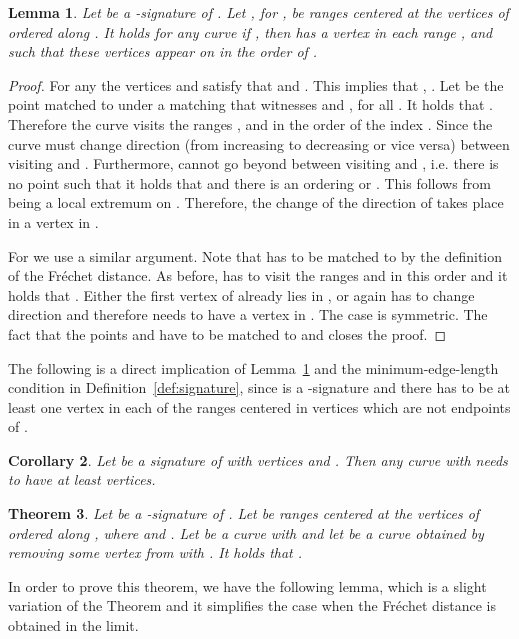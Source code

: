 \documentclass[11pt, letter]{article}
\newtheorem{theorem}{Theorem}[section]
\newtheorem{lemma}[theorem]{Lemma}
\newtheorem{corollary}[theorem]{Corollary}
\newcommand{\thmlab}[1]{{\label{theo:#1}}}
\newcommand{\lemlab}[1]{\label{lemma:#1}}
\newcommand{\lemref}[1]{Lemma~\ref{lemma:#1}}
\newcommand{\defref}[1]{Definition~\ref{def:#1}}
\newcommand{\corlab}[1]{\label{cor:#1}}
\newcommand{\Frechet}{Fr\'echet\xspace}
\begin{document}
\begin{lemma}\lemlab{nec:suff}
Let  be a -signature of . Let ,  for , be ranges centered at the vertices of  ordered along . It holds for any curve  if , then  has a vertex in each range , and such that these vertices appear on  in the order of .
\end{lemma}

\begin{proof}
For any  the vertices  and  satisfy that  and . This implies that , . 
Let  be the point matched to  under a matching that witnesses  and , for all . It holds that .
Therefore the curve  visits the ranges ,  and  in the order of the index . Since  the curve  must change direction (from increasing to decreasing or vice versa) between visiting  and . Furthermore,  cannot go beyond  between visiting  and , i.e. there is no point  such that it holds that  and there is an ordering  or . This follows from  being a local extremum on . Therefore, the change of the direction of  takes place in a vertex in . 




For  we use a similar argument. Note that  has to be matched to  by the definition of the \Frechet distance. As before,  has to visit the ranges  and  in this order and it holds that . Either the first vertex of  already lies in , or again  has to change direction and therefore needs to have a vertex in . The case  is symmetric.  
The fact that the points  and  have to be matched to  and  closes the proof.
\end{proof}




The following is a direct implication of \lemref{nec:suff} and the minimum-edge-length condition in \defref{signature}, since  is a -signature and there has to be at least one vertex in each of the ranges centered in vertices which are not endpoints of . 
\begin{corollary}\corlab{nec:suff}
Let  be a signature of  with  vertices and . Then any curve  with  needs to have at least  vertices.
\end{corollary}


\begin{theorem}\thmlab{remove:one}
Let  be a -signature of .
Let  be ranges centered at the vertices of 
ordered along , where  and
. Let  be a curve with
 and let  be a curve obtained by removing 
some vertex  from  with . 
It holds that . 
\end{theorem}

In order to prove this theorem, we have the following lemma, which is a slight variation of the Theorem and it simplifies the case when the \Frechet distance is obtained in the limit.
\end{document}
